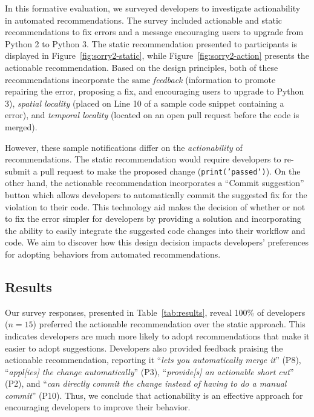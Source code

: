 In this formative evaluation, we surveyed developers to investigate actionability in automated recommendations. The survey included actionable and static recommendations to fix \PEP errors and a message encouraging users to upgrade from Python 2 to Python 3. The static recommendation presented to participants is displayed in Figure~\ref{fig:sorry2-static}, while Figure~\ref{fig:sorry2-action} presents the actionable recommendation. Based on the \framework design principles, both of these recommendations incorporate the same \textit{feedback} (information to promote repairing the \PEP error, proposing a fix, and encouraging users to upgrade to Python 3), \textit{spatial locality} (placed on Line 10 of a sample code snippet containing a \PEP error), and \textit{temporal locality} (located on an open pull request before the code is merged). 



\newpage
However, these sample notifications differ on the \textit{actionability} of recommendations. The static recommendation would require developers to re-submit a pull request to make the proposed change (\texttt{print('passed')}). On the other hand, the actionable recommendation incorporates a ``Commit suggestion'' button which allows developers to automatically commit the suggested fix for the \PEP violation to their code. This technology aid makes the decision of whether or not to fix the error simpler for developers by providing a solution and incorporating the ability to easily integrate the suggested code changes into their workflow and code. We aim to discover how this design decision impacts developers' preferences for adopting behaviors from automated recommendations.

\subsection{Results}

Our survey responses, presented in Table~\ref{tab:results}, reveal 100\% of developers ($n = 15$) preferred the actionable recommendation over the static approach. This indicates developers are much more likely to adopt recommendations that make it easier to adopt suggestions. Developers also provided feedback praising the actionable recommendation, reporting it ``\textit{lets you automatically merge it}'' (P8), ``\textit{appl[ies] the change automatically}'' (P3), ``\textit{provide[s] an actionable short cut}'' (P2), and ``\textit{can directly commit the change instead of having to do a manual commit}'' (P10). Thus, we conclude that actionability is an effective approach for encouraging developers to improve their behavior. 

